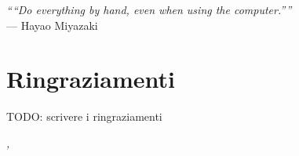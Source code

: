 \cleardoublepage
{}
{}

\begin{flushright}{
    \slshape
    ``“Do everything by hand, even when using the computer.”''} \\
    \medskip
    --- Hayao Miyazaki
\end{flushright}


\bigskip

\begingroup
\let\clearpage\relax
\let\cleardoublepage\relax
\let\cleardoublepage\relax

\chapter*{Ringraziamenti}





TODO: scrivere i ringraziamenti
\bigskip

\noindent\textit{\myLocation, \myTime}
\hfill \myName

\endgroup
